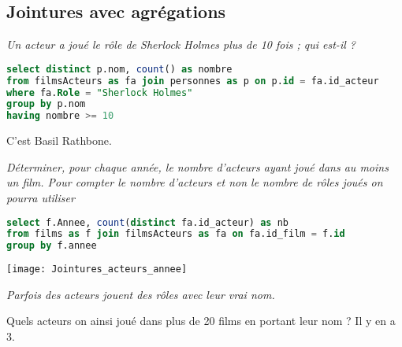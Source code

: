 \subsection{Jointures avec agrégations}
\begin{Exercise} \it Un acteur a joué le rôle de Sherlock Holmes plus de 10 fois ; qui est-il ? 
\end{Exercise}
\begin{Answer}
\begin{lstlisting}[language=SQL]
select distinct p.nom, count() as nombre
from filmsActeurs as fa join personnes as p on p.id = fa.id_acteur
where fa.Role = "Sherlock Holmes"
group by p.nom
having nombre >= 10
\end{lstlisting}

C'est Basil Rathbone.
\end{Answer}
\begin{Exercise} \it Déterminer, pour chaque année, le nombre d'acteurs ayant joué dans au moins un film. Pour compter le nombre d'acteurs et non le nombre de rôles joués on pourra utiliser
\end{Exercise}
\begin{Answer}
\begin{lstlisting}[language=SQL]
select f.Annee, count(distinct fa.id_acteur) as nb
from films as f join filmsActeurs as fa on fa.id_film = f.id
group by f.annee
\end{lstlisting}
\begin{center}
    \texttt{[image: Jointures\_acteurs\_annee]}
  \end{center}
  \end{Answer}
\begin{Exercise} \it Parfois des acteurs jouent des rôles avec leur vrai nom. 

Quels acteurs on ainsi joué dans plus de 20 films en portant leur nom ? Il y en a 3.
\end{Exercise}
